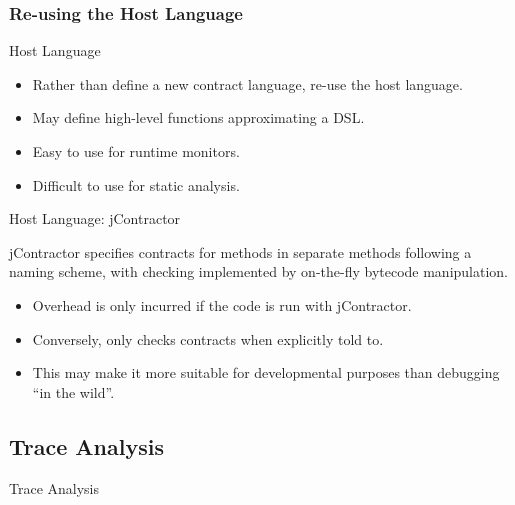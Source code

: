 \documentclass[12pt]{beamer}
\begin{document}
\subsubsection{Re-using the Host Language}
\label{sec:runver-sbc-aop}

\begin{frame}{Host Language}
  \begin{itemize}
    \item Rather than define a new contract language, re-use the host
      language.

    \item May define high-level functions approximating a DSL.

    \item Easy to use for runtime monitors.

    \item Difficult to use for static analysis.
  \end{itemize}
\end{frame}

\begin{frame}{Host Language: \small jContractor}

  jContractor \parencite{jcontractor} specifies contracts for methods
  in separate methods following a naming scheme, with checking
  implemented by on-the-fly bytecode manipulation.

  \begin{itemize}
    \item Overhead is only incurred if the code is run with
      jContractor.

    \item Conversely, only checks contracts when explicitly told to.

    \item This may make it more suitable for developmental purposes
      than debugging ``in the wild''.
  \end{itemize}
\end{frame}


\subsection{Trace Analysis}
\label{sec:runver-trace}

\begin{frame}
  \begin{center}
    \Large Trace Analysis
  \end{center}
\end{frame}
\end{document}
